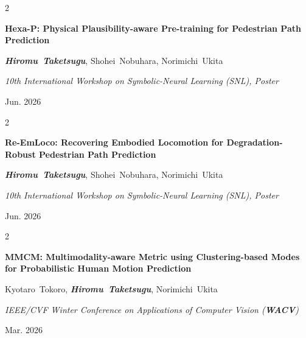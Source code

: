 \documentclass[10pt, letterpaper]{article}
\newenvironment{twocolentry}[2][]{
    \onecolentry
    \def\secondColumn{#2}
    \setcolumnwidth{\fill, 4.5 cm}
    \begin{paracol}{2}
}{
    \switchcolumn \raggedleft \secondColumn
    \end{paracol}
    \endonecolentry
} %
\begin{document}
        \vspace{0.2 cm}

        \begin{samepage}
            \begin{twocolentry}{
                Jun. 2026
            }
                \textbf{Hexa-P: Physical Plausibility-aware Pre-training for Pedestrian Path Prediction}

                \vspace{0.10 cm}

                \mbox{\textbf{\textit{Hiromu Taketsugu}}}, \mbox{Shohei Nobuhara}, \mbox{Norimichi Ukita}
                \vspace{0.10 cm}

                \textit{10th International Workshop on Symbolic-Neural Learning (SNL), Poster}
            \end{twocolentry}
        \end{samepage}

        \vspace{0.2 cm}

        \begin{samepage}
            \begin{twocolentry}{
                Jun. 2026
            }
                \textbf{Re-EmLoco: Recovering Embodied Locomotion for Degradation-Robust Pedestrian Path Prediction}

                \vspace{0.10 cm}

                \mbox{\textbf{\textit{Hiromu Taketsugu}}}, \mbox{Shohei Nobuhara}, \mbox{Norimichi Ukita}
                \vspace{0.10 cm}

                \textit{10th International Workshop on Symbolic-Neural Learning (SNL), Poster}
            \end{twocolentry}
        \end{samepage}

        \vspace{0.2 cm}

        \begin{samepage}
            \begin{twocolentry}{
                Mar. 2026
            }
                \textbf{MMCM: Multimodality-aware Metric using Clustering-based Modes for Probabilistic Human Motion Prediction}

                \vspace{0.10 cm}

                \mbox{Kyotaro Tokoro}, \mbox{\textbf{\textit{Hiromu Taketsugu}}}, \mbox{Norimichi Ukita}
                \vspace{0.10 cm}

                \textit{IEEE/CVF Winter Conference on Applications of Computer Vision (\textbf{WACV})}
            \end{twocolentry}
        \end{samepage}
        
\end{document}
